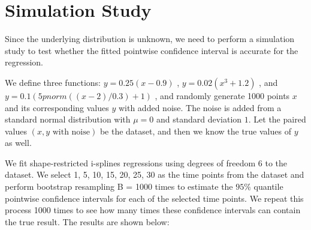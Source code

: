 \documentclass[12pt]{article}
\begin{document}
\section{Simulation Study}
\label{Simulation Study}

Since the underlying distribution is unknown, we need to perform a simulation study to test whether the fitted pointwise confidence interval is accurate for the regression.

We define three functions: \(y = 0.25(x - 0.9)\) , \(y = 0.02(x^3+1.2)\) , and \( y = 0.1 (5pnorm((x - 2) / 0.3) + 1)\) , and randomly generate 1000 points \(x\) and its corresponding values \(y\) with added noise. The noise is added from a standard normal distribution with \(\mu = 0\) and standard deviation \(1\). Let the paired values \((x, y\text{ with noise})\) be the dataset, and then we know the true values of \(y\) as well.

We fit shape-restricted i-splines regressions using degrees of freedom 6 to the dataset. We select 1, 5, 10, 15, 20, 25, 30 as the time points from the dataset and perform bootstrap resampling B = 1000 times to estimate the \(95\%\) quantile pointwise confidence intervals for each of the selected time points. We repeat this process 1000 times to see how many times these confidence intervals can contain the true result. The results are shown below:
\end{document}
